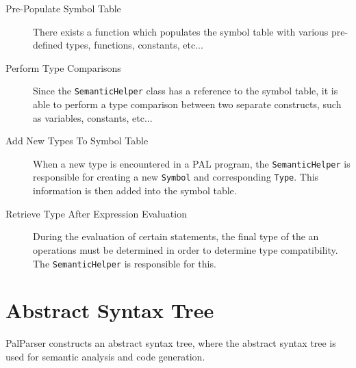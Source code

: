 \documentclass{article}
\begin{document}
\begin{description}
	
\item[Pre-Populate Symbol Table]
	There exists a function which populates the symbol table with various pre-defined types,
	functions, constants, etc...
	
\item[Perform Type Comparisons]
	Since the \texttt{SemanticHelper} class has a reference to the symbol table, it is able to
	perform a type comparison between two separate constructs, such as variables, constants, etc...
	
\item[Add New Types To Symbol Table]
	When a new type is encountered in a PAL program, the \texttt{SemanticHelper} is responsible for creating
	a new \texttt{Symbol} and corresponding \texttt{Type}. This information is then added into the symbol table.
	
\item[Retrieve Type After Expression Evaluation]
	During the evaluation of certain statements, the final type of the an operations must be determined in order
	to determine type compatibility. The \texttt{SemanticHelper} is responsible for this.
	
	
\end{description}

\section*{Abstract Syntax Tree}


	PalParser constructs an abstract syntax tree, where the abstract syntax tree is 
	used for semantic analysis and code generation. 
\end{document}
